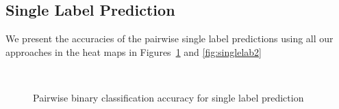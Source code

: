 \documentclass{article} %
\begin{document}
 \subsection{Single Label Prediction}
 We present the accuracies of the pairwise single label predictions using all our approaches in the heat maps in Figures~\ref{fig:singlelab1} and \ref{fig:singlelab2}
\begin{figure}[!hbt]
\vspace{-0.5cm}
\centering
{} \\
\caption{Pairwise binary classification accuracy for single label prediction}
\label{fig:singlelab1}
\end{figure}
\end{document}
